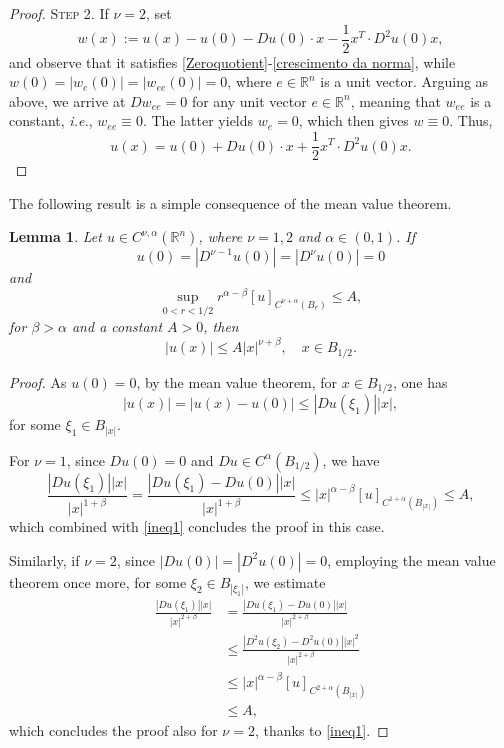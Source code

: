 \documentclass[11pt,reqno]{amsart}
\newtheorem{lemma}{Lemma}
\numberwithin{equation}{section}
\numberwithin{theorem}{section}
\numberwithin{lemma}{section}
\numberwithin{corollary}{section}
\numberwithin{remark}{section}
\numberwithin{proposition}{section}
\numberwithin{definition}{section}
\newcommand{\R}{\mathbb{R}}
\begin{document}
\begin{proof}
\medskip

\textsc{Step 2.} If $\nu=2$, set 
$$
w(x):=u(x)-u(0)-Du(0)\cdot x-\frac{1}{2}x^T\cdot D^2u(0)x,
$$
and observe that it satisfies \eqref{Zeroquotient}-\eqref{crescimento da norma}, while $w(0)=|w_{e}(0)|=|w_{ee}(0)|=0$, where $e\in\R^n$ is a unit vector. Arguing as above, we arrive at $Dw_{ee}=0$ for any unit vector $e\in\R^n$, meaning that $w_{ee}$ is a constant, \textit{i.e.}, $w_{ee}\equiv0$. The latter yields $w_e=0$, which then gives $w\equiv0$. Thus, 
$$
u(x)=u(0)+Du(0)\cdot x+\frac{1}{2}x^T\cdot D^2u(0)x.
$$
\end{proof}

The following result is a simple consequence of the mean value theorem.

\begin{lemma}\label{caracterizacao de c1alpha}
Let $u\in C^{\nu,\alpha}(\R^n)$, where $\nu=1,2$ and $\alpha\in(0,1)$. If 
$$
u(0)=|D^{\nu-1}u(0)|=|D^\nu u(0)|=0
$$
and
$$
\sup_{0<r<1/2}r^{\alpha-\beta}[u]_{C^{\nu+\alpha}(B_r)}\le A,
$$
for $\beta>\alpha$ and a constant $A>0$, then
$$
|u(x)|\leq A|x|^{\nu+\beta}, \quad x\in B_{1/2}.
$$
\end{lemma}

\begin{proof}
As $u(0)=0$, by the mean value theorem, for $x\in B_{1/2}$, one has
\begin{equation}\label{ineq1}
   |u(x)|=|u(x)-u(0)|\le|Du(\xi_1)||x|,
\end{equation}
for some $\xi_1\in B_{|x|}$. 

For $\nu=1$, since $Du(0)=0$ and $Du\in C^{\alpha}\left(B_{1/2}\right)$, we have
$$
\frac{|Du(\xi_1)||x|}{|x|^{1+\beta}}=\frac{|Du(\xi_1)-Du(0)||x|}{|x|^{1+\beta}}\le|x|^{\alpha-\beta}\left[u\right]_{C^{1+\alpha} \left( B_{|x|}\right)}\le A,
$$
which combined with \eqref{ineq1} concludes the proof in this case. 

Similarly, if $\nu=2$, since $|Du(0)|=|D^2u(0)|=0$, employing the mean value theorem once more, for some $\xi_2\in B_{|\xi_1|}$, we estimate
\begin{equation*}
    \begin{split}
        \frac{|Du(\xi_1)||x|}{|x|^{2+\beta}}&=\frac{|Du(\xi_1)-Du(0)||x|}{|x|^{2+\beta}}\\
        &\le\frac{|D^2u(\xi_2)-D^2u(0)||x|^2}{|x|^{2+\beta}}\\
        &\le|x|^{\alpha-\beta}\left[u\right]_{C^{2+\alpha}\left( B_{|x|}\right)}\\
        &\le A,
    \end{split}
\end{equation*}
which concludes the proof also for $\nu=2$, thanks to \eqref{ineq1}.
\end{proof}
\end{document}
